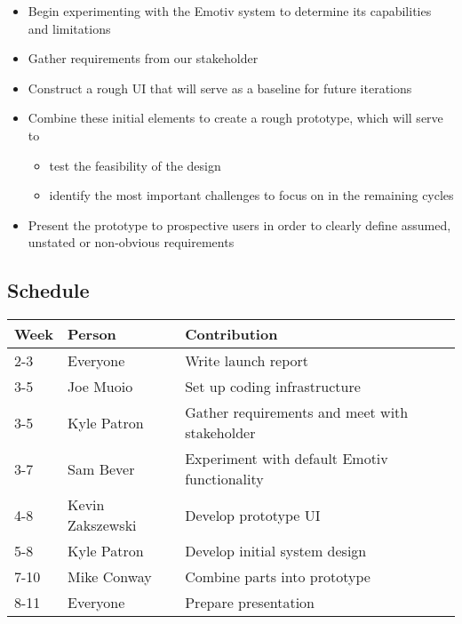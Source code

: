 \documentclass{report}
\begin{document}
\begin{itemize}
    \item Begin experimenting with the Emotiv system to determine its
capabilities and limitations
    \item Gather requirements from our stakeholder
    \item Construct a rough UI that will serve as a baseline for future
iterations
    \item Combine these initial elements to create a rough prototype, which
will serve to
        \begin{itemize}
            \item test the feasibility of the design
            \item identify the most important challenges to focus on in the
                remaining cycles
        \end{itemize}
    \item Present the prototype to prospective users in order to clearly
        define assumed, unstated or non-obvious requirements
\end{itemize}

\subsection*{Schedule}

\begin{tabular}{| l | l | l |}
    \hline
    Week & Person & Contribution \\
    \hline \hline

    2-3 & Everyone & Write launch report \\ \hline
    3-5 & Joe Muoio & Set up coding infrastructure \\ \hline
    3-5 & Kyle Patron & Gather requirements and meet with stakeholder \\ \hline
    3-7 & Sam Bever & Experiment with default Emotiv functionality \\ \hline
    4-8 & Kevin Zakszewski & Develop prototype UI \\ \hline
		5-8 & Kyle Patron & Develop initial system design \\ \hline
    7-10 & Mike Conway & Combine parts into prototype \\ \hline
    8-11 & Everyone & Prepare presentation \\ \hline
\end{tabular}
\end{document}
